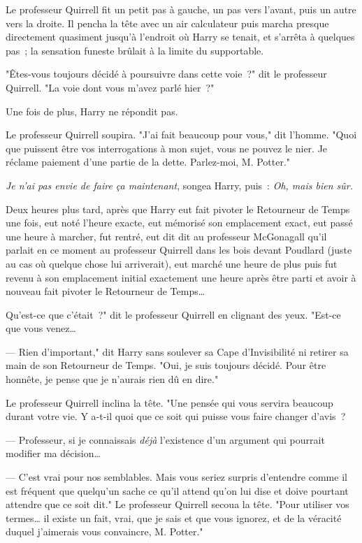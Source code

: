 Le professeur Quirrell fit un petit pas à gauche, un pas vers l'avant, puis un autre vers la droite. Il pencha la tête avec un air calculateur puis marcha presque directement quasiment jusqu'à l'endroit où Harry se tenait, et s'arrêta à quelques pas~; la sensation funeste brûlait à la limite du supportable.

"Êtes-vous toujours décidé à poursuivre dans cette voie~?" dit le professeur Quirrell. "La voie dont vous m'avez parlé hier~?"

Une fois de plus, Harry ne répondit pas.

Le professeur Quirrell soupira. "J'ai fait beaucoup pour vous," dit l'homme. "Quoi que puissent être vos interrogations à mon sujet, vous ne pouvez le nier. Je réclame paiement d'une partie de la dette. Parlez-moi, M. Potter."

\emph{Je n'ai pas envie de faire ça maintenant}, songea Harry, puis~: \emph{Oh, mais bien sûr.}

\later

Deux heures plus tard, après que Harry eut fait pivoter le Retourneur de Temps une fois, eut noté l'heure exacte, eut mémorisé son emplacement exact, eut passé une heure à marcher, fut rentré, eut dit dit au professeur McGonagall qu'il parlait en ce moment au professeur Quirrell dans les bois devant Poudlard (juste au cas où quelque chose lui arriverait), eut marché une heure de plus puis fut revenu à son emplacement initial exactement une heure après être parti et avoir à nouveau fait pivoter le Retourneur de Temps…

\later

Qu'est-ce que c'était~?" dit le professeur Quirrell en clignant des yeux. "Est-ce que vous venez…

--- Rien d'important," dit Harry sans soulever sa Cape d'Invisibilité ni retirer sa main de son Retourneur de Temps. "Oui, je suis toujours décidé. Pour être honnête, je pense que je n'aurais rien dû en dire."

Le professeur Quirrell inclina la tête. "Une pensée qui vous servira beaucoup durant votre vie. Y a-t-il quoi que ce soit qui puisse vous faire changer d'avis~?

--- Professeur, si je connaissais \emph{déjà} l'existence d'un argument qui pourrait modifier ma décision…

--- C'est vrai pour nos semblables. Mais vous seriez surpris d'entendre comme il est fréquent que quelqu'un sache ce qu'il attend qu'on lui dise et doive pourtant attendre que ce soit dit." Le professeur Quirrell secoua la tête. "Pour utiliser vos termes… il existe un fait, vrai, que je sais et que vous ignorez, et de la véracité duquel j'aimerais vous convaincre, M. Potter."

